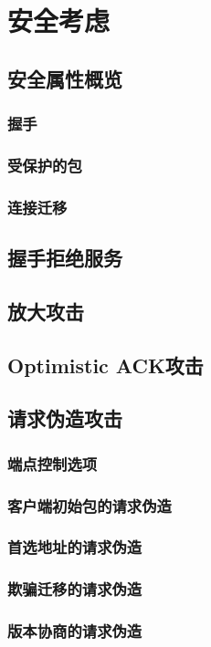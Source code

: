 \section{安全考虑}
\subsection{安全属性概览}
\subsubsection{握手}
\subsubsection{受保护的包}
\subsubsection{连接迁移}

\subsection{握手拒绝服务}
\subsection{放大攻击}
\subsection{Optimistic ACK攻击}
\subsection{请求伪造攻击}

\subsubsection{端点控制选项}
\subsubsection{客户端初始包的请求伪造}
\subsubsection{首选地址的请求伪造}
\subsubsection{欺骗迁移的请求伪造}
\subsubsection{版本协商的请求伪造}
